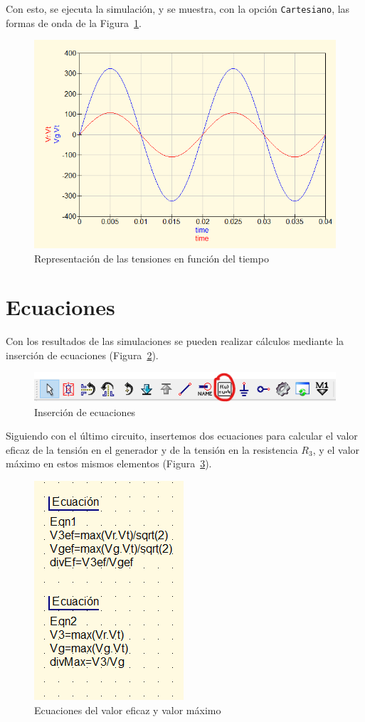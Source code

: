 \documentclass[a4paper,10pt]{article} %
\begin{document}
Con esto, se ejecuta la simulación, y se muestra, con la opción \texttt{Cartesiano}, las formas de onda de la Figura~\ref{fig.qucs24}.
\begin{figure}[h!]
    \centering
    \includegraphics[width=0.85\linewidth]{../figs/qucs_evolucionTemporal.png}
    \caption{Representación de las tensiones en función del tiempo}
    \label{fig.qucs24}
\end{figure}

\clearpage
\section{Ecuaciones}

Con los resultados de las simulaciones se pueden realizar cálculos mediante la inserción de ecuaciones (Figura~\ref{fig.qucs25}). 

\begin{figure}[h!]
    \centering
    \includegraphics[width=0.85\linewidth]{../figs/qucs_insertarEcuacion.png}
    \caption{Inserción de ecuaciones}
    \label{fig.qucs25}
\end{figure}

Siguiendo con el último circuito, insertemos dos ecuaciones para calcular el valor eficaz de la tensión en el generador y de la tensión en la resistencia $R_3$, y el valor máximo en estos mismos elementos (Figura~\ref{fig.qucs26}).
\begin{figure}[h!]
    \centering
    \includegraphics[width=0.25\linewidth]{../figs/qucs_ecuacion.png}
    \caption{Ecuaciones del valor eficaz y valor máximo}
    \label{fig.qucs26}
\end{figure}
\end{document}
